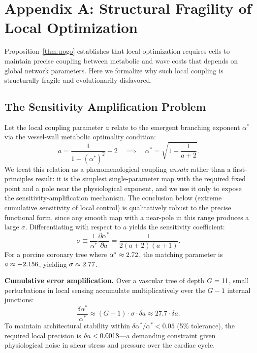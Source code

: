\section{Appendix A: Structural Fragility of Local Optimization}
\label{app:fragility}

Proposition~\ref{thm:nogo} establishes that local optimization requires cells to
maintain precise coupling between metabolic and wave costs that depends on
global network parameters. Here we formalize why such local coupling is
structurally fragile and evolutionarily disfavored.

\subsection{The Sensitivity Amplification Problem}

Let the local coupling parameter $a$ relate to the emergent branching exponent
$\alpha^*$ via the vessel-wall metabolic optimality condition:
\begin{equation}
    a = \frac{1}{1-(\alpha^*)^2} - 2 \quad \implies \quad \alpha^* = \sqrt{1 - \frac{1}{a+2}}.
\end{equation}
We treat this relation as a phenomenological coupling \emph{ansatz} rather
than a first-principles result: it is the simplest single-parameter map with the
required fixed point and a pole near the physiological exponent, and we use it
only to expose the sensitivity-amplification mechanism. The conclusion below
(extreme cumulative sensitivity of local control) is qualitatively robust to the
precise functional form, since any smooth map with a near-pole in this range
produces a large $\sigma$. Differentiating with respect to $a$ yields the
sensitivity coefficient:
\begin{equation}
    \sigma \equiv \frac{1}{\alpha^*}\frac{\partial \alpha^*}{\partial a} = \frac{1}{2(a+2)(a+1)}.
\end{equation}
For a porcine coronary tree where $\alpha^* \approx 2.72$, the matching
parameter is $a \approx -2.156$, yielding $\sigma \approx
2.77$.

\textbf{Cumulative error amplification.} Over a vascular tree of depth $G =
11$, small perturbations in local sensing accumulate multiplicatively over
the $G-1$ internal junctions:
\begin{equation}
    \frac{\delta \alpha^*}{\alpha^*} \approx (G-1) \cdot \sigma \cdot \delta a \approx 27.7 \cdot \delta a.
\end{equation}
To maintain architectural stability within $\delta\alpha^*/\alpha^* < 0.05$ (5\%
tolerance), the required local precision is $\delta a <
0.0018$---a demanding constraint given physiological noise in
shear stress and pressure over the cardiac cycle.


